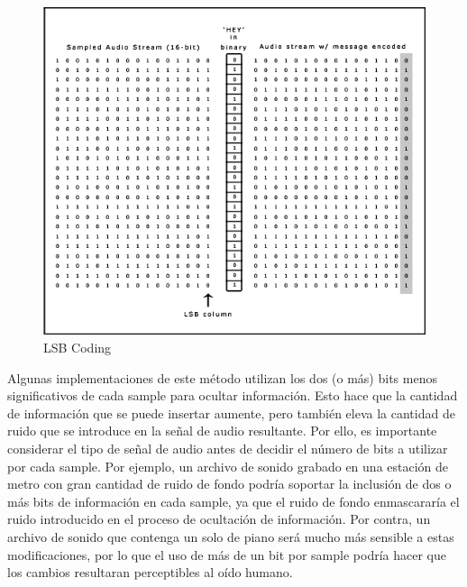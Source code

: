\documentclass[12pt]{article}
\begin{document}
\begin{figure}
  \centering
    \includegraphics[width=\textwidth]{img/lsbimage}
  \caption{LSB Coding}
  \label{lsbcoding}
\end{figure}

Algunas implementaciones de este método utilizan los dos (o más) bits menos significativos de cada sample para ocultar información. Esto hace que la cantidad de información que se puede insertar aumente, pero también eleva la cantidad de ruido que se introduce en la señal de audio resultante. Por ello, es importante considerar el tipo de señal de audio antes de decidir el número de bits a utilizar por cada sample. Por ejemplo, un archivo de sonido grabado en una estación de metro con gran cantidad de ruido de fondo podría soportar la inclusión de dos o más bits de información en cada sample, ya que el ruido de fondo enmascararía el ruido introducido en el proceso de ocultación de información. Por contra, un archivo de sonido que contenga un solo de piano será mucho más sensible a estas modificaciones, por lo que el uso de más de un bit por sample podría hacer que los cambios resultaran perceptibles al oído humano.
\end{document}

